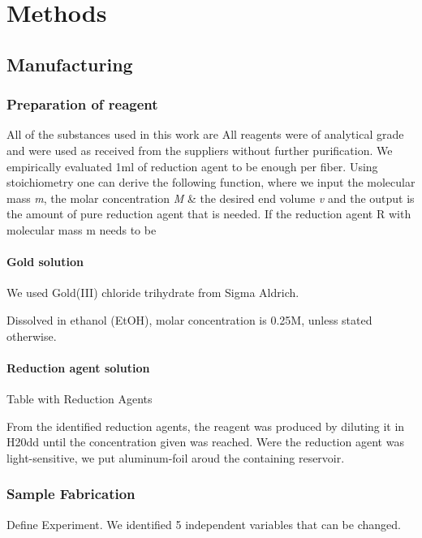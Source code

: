 \section{Methods}

\subsection{Manufacturing}

\subsubsection{Preparation of reagent}
All of the substances used in this work are 
All reagents were of analytical grade and were used as received from the suppliers
without further purification.
We empirically evaluated 1ml of reduction agent to be enough per fiber. Using stoichiometry one can derive the following function, where we input the molecular mass \textit{m}, the molar concentration \textit{M} \& the desired end volume \textit{v} and the output is the amount of pure reduction agent that is needed. 
If the reduction agent R with molecular mass m needs to be 


\paragraph{Gold solution}

We used Gold(III) chloride trihydrate from Sigma Aldrich. 

Dissolved in ethanol (EtOH), molar concentration is 0.25M, unless stated otherwise.

\paragraph{Reduction agent solution}


Table with Reduction Agents

From the identified reduction agents, the reagent was produced by diluting it in H20dd until the concentration given was reached. Were the reduction agent was light-sensitive, we put aluminum-foil aroud the containing reservoir.

\subsubsection{Sample Fabrication}

Define Experiment. We identified 5 independent variables that can be changed.

